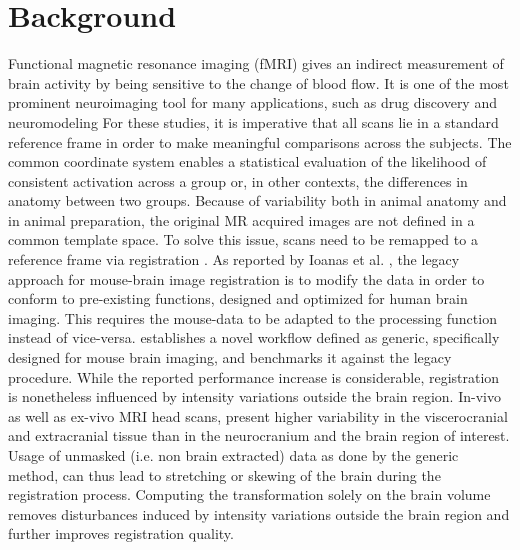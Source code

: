 \section{Background}
Functional magnetic resonance imaging (fMRI) gives an indirect measurement of brain activity by being sensitive to the change of blood flow. It is one of the most prominent neuroimaging tool for many applications, such as drug discovery
and neuromodeling
For these studies, it is imperative that all scans lie in a standard reference frame in order to make meaningful comparisons across the subjects.
The common coordinate system enables a statistical evaluation of the likelihood of consistent activation across a group or, in other contexts, the differences in anatomy between two groups.
Because of variability both in animal anatomy and in animal preparation, the original MR acquired images are not defined in a common template space.
To solve this issue, scans need to be remapped to a reference frame via registration \cite{maintz_overview_nodate, sotiras_deformable_2013}.
As reported by Ioanas et al. \cite{ioanas_optimized_2019}, the legacy approach for mouse-brain image registration is to modify the data in order to conform to pre-existing functions, designed and optimized for human brain imaging.
This requires the mouse-data to be adapted to the processing function instead of vice-versa.
\cite{ioanas_optimized_2019} establishes a novel workflow defined as generic, specifically designed for mouse brain imaging, and benchmarks it against the legacy procedure.
While the reported performance increase is considerable, registration is nonetheless influenced by intensity variations outside the brain region.
In-vivo as well as ex-vivo MRI head scans, present higher variability in the viscerocranial and extracranial tissue than in the neurocranium and the brain region of interest.
Usage of unmasked (i.e. non brain extracted) data as done by the generic method, can thus lead to stretching or skewing of the brain during the registration process.
Computing the transformation solely on the brain volume removes disturbances induced by intensity variations outside the brain region and further improves registration quality.

